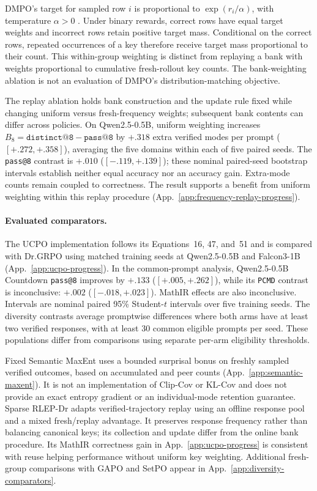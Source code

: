 \documentclass{article}
\newcommand{\1}{\mathbf 1}
\newcommand{\pmd}{\texttt{PCMD}}
\theoremstyle{remark}
\theoremstyle{definition}
\theoremstyle{plain}
\begin{document}
DMPO's target for sampled row $i$ is proportional to
$\exp(r_i/\alpha)$, with temperature $\alpha>0$
\citep[Eq.~5]{li2026distribution}. Under binary rewards, correct rows have
equal target weights and incorrect rows retain positive target mass.
Conditional on the correct rows, repeated occurrences of a key therefore
receive target mass proportional to their count. This within-group
weighting is distinct from replaying a bank with weights proportional to
cumulative fresh-rollout key counts. The bank-weighting ablation is not an
evaluation of DMPO's distribution-matching objective.

The replay ablation holds bank construction and the update rule fixed while
changing uniform versus fresh-frequency weights; subsequent bank contents
can differ across policies. On Qwen2.5-0.5B, uniform weighting increases
$B_8=\texttt{distinct@8}-\texttt{pass@8}$ by $+.318$ extra verified modes
per prompt ($[+.272,+.358]$), averaging the five domains within each of five
paired seeds. The \texttt{pass@8} contrast is $+.010$ ($[-.119,+.139]$);
these nominal paired-seed bootstrap intervals establish neither equal
accuracy nor an accuracy gain. Extra-mode counts remain coupled to
correctness. The result supports a benefit from uniform weighting within
this replay procedure (App.~\ref{app:frequency-replay-progress}).

\paragraph{Evaluated comparators.}
The UCPO implementation follows its Equations~16, 47, and~51 and is compared
with Dr.GRPO using matched training seeds at Qwen2.5-0.5B and Falcon3-1B
(App.~\ref{app:ucpo-progress}). In the common-prompt analysis, Qwen2.5-0.5B
Countdown \texttt{pass@8} improves by $+.133$ ($[+.005,+.262]$), while its
\pmd{} contrast is inconclusive: $+.002$ ($[-.018,+.023]$). MathIR effects
are also inconclusive. Intervals are nominal paired 95\% Student-$t$
intervals over five training seeds. The diversity contrasts average promptwise
differences where both arms have at least two verified responses, with at
least 30 common eligible prompts per seed. These populations differ from
comparisons using separate per-arm eligibility thresholds.

Fixed Semantic MaxEnt uses a bounded surprisal bonus on freshly sampled
verified outcomes, based on accumulated and peer counts
(App.~\ref{app:semantic-maxent}). It is not an implementation of Clip-Cov
or KL-Cov and does not provide an exact entropy gradient or an individual-mode
retention guarantee. Sparse RLEP-Dr adapts verified-trajectory replay
\citep{zhang2025rlep} using an offline response pool and a mixed fresh/replay
advantage. It preserves response frequency rather than balancing canonical
keys; its collection and update differ from the online bank procedure.
Its MathIR correctness gain in App.~\ref{app:ucpo-progress} is consistent
with reuse helping performance without uniform key weighting.
Additional fresh-group comparisons with GAPO and SetPO appear in
App.~\ref{app:diversity-comparators}.
\end{document}
